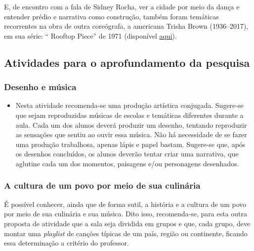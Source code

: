 \documentclass[12pt]{extarticle}
\begin{document}
E, de encontro com a fala de Sidney Rocha, ver a cidade por meio da dança e entender prédio 
e narrativa como construção, também foram temáticas recorrentes na obra de outra coreógrafa, 
a americana Trisha Brown (1936--2017), em sua série: `` Rooftop Piece'' de 1971 (disponível 
\href{https://www.youtube.com/watch?v=s6IR8lmGTxE&ab_channel=TheGetty}{aqui}). 

\subsection{Atividades para o aprofundamento da pesquisa}

\subsubsection{Desenho e música}


\begin{itemize}
\item
  Nesta atividade recomenda-se uma produção artística conjugada.
  Sugere-se que sejam reproduzidas músicas de escolas e temáticas
  diferentes durante a aula. Cada um dos alunos deverá produzir um
  desenho, tentando reproduzir as sensações que sentiu ao ouvir essa
  música. Não há necessidade de se fazer uma produção trabalhosa, apenas
  lápis e papel bastam. Sugere-se que, após os desenhos concluídos, os
  alunos deverão tentar criar uma narrativa, que aglutine cada um dos
  momentos, paisagens e/ou personagens desenhados.
\end{itemize}

\subsubsection{A cultura de um povo por meio de sua culinária}

É possível conhecer, ainda que de forma sutil, a história e a
  cultura de um povo por meio de sua culinária e sua música. Dito isso,
  recomenda-se, para esta outra proposta de atividade que a sala seja
  dividida em grupos e que, cada grupo, deve montar uma \emph{playlist} de
  canções típicas de um país, região ou continente, ficando essa
  determinação a critério do professor.
\end{document}
